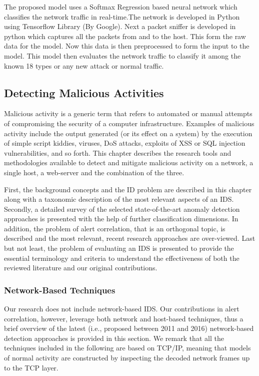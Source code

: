 \documentclass[12pt]{article}
\theoremstyle{definition}
\begin{document}
		The proposed model uses a Softmax Regression based neural network which classifies the network traffic in real-time.The network is developed in Python using Tensorflow Library (By Google). Next a packet sniffer is developed in python which captures all the packets from and to the host. This form the raw data for the model. Now this data is then preprocessed to form the input to the model. This model then evaluates the network traffic to classify it among the known 18 types or any new attack or normal traffic.
			
		\subsection{Detecting Malicious Activities}
		Malicious activity is a generic term that refers to automated or manual attempts of compromising the security of a computer infrastructure. Examples of malicious activity include the output generated (or its effect on a system) by the execution of simple script kiddies, viruses, DoS attacks, exploits of XSS or SQL injection vulnerabilities, and so forth. This chapter describes the research tools and methodologies available to detect and
		mitigate malicious activity on a network, a single host, a web-server and the combination of the three.
		
		First, the background concepts and the ID problem are described in this chapter along with a taxonomic description of the most relevant aspects of an IDS. Secondly, a detailed survey of the selected state-of-the-art anomaly detection approaches is presented with the help of further classification dimensions. In addition, the problem of alert correlation, that is an orthogonal topic, is described and the most relevant, recent research approaches are over-viewed. Last but not least, the problem of evaluating an IDS is presented to provide the essential terminology and criteria to understand the effectiveness of both the reviewed literature and our original contributions.
		
		
			\subsubsection{Network-Based Techniques}
			Our research does not include network-based IDS. Our contributions in alert correlation, however, leverage both network and host-based techniques, thus a brief overview of the latest (i.e., proposed between 2011 and 2016) network-based detection approaches is provided in this section. We remark that all the techniques included in the following are based on TCP/IP, meaning that models of normal activity are constructed by inspecting the decoded network frames up to the TCP layer.
			
\end{document}
